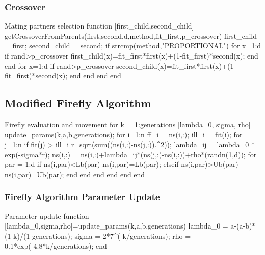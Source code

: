 \subsubsection{Crossover}
\begin{mylisting}[enhanced,drop shadow,label={alg:crossover}]{Mating partners selection}
function [first_child,second_child] = getCrossoverFromParents(first,second,d,method,fit_first,p_crossover)
  first_child = first;
  second_child = second;
  if strcmp(method,"PROPORTIONAL")
    for x=1:d
      if rand>p_crossover
        first_child(x)=fit_first*first(x)+(1-fit_first)*second(x);
      end
    end
    for x=1:d
      if rand>p_crossover
        second_child(x)=fit_first*first(x)+(1-fit_first)*second(x);
      end
    end
  end
end
\end{mylisting}

\subsection{Modified Firefly Algorithm}



\begin{mylisting}[enhanced,drop shadow,label={alg:fa_movement}]{Firefly evaluation and movement}
for k = 1:generations
  [lambda_0, sigma, rho] = update_params(k,a,b,generations);  
  for i=1:n
    ff_i = ns(i,:);
    ill_i = fit(i);
    for j=1:n
      if fit(j) > ill_i
        r=sqrt(sum((ns(i,:)-ns(j,:)).^2));
        lambda_ij = lambda_0 * exp(-sigma*r);
        ns(i,:) = ns(i,:)+lambda_ij*(ns(j,:)-ns(i,:))+rho*(randn(1,d));
        for par = 1:d
          if ns(i,par)<Lb(par) 
            ns(i,par)=Lb(par);
          elseif ns(i,par)>Ub(par)
            ns(i,par)=Ub(par);
          end
        end
      end
    end
  end
end
\end{mylisting}

\subsubsection{Firefly Algorithm Parameter Update}

\begin{mylisting}[enhanced,drop shadow,label={alg:fa_update}]{Parameter update}
function [lambda_0,sigma,rho]=update_params(k,a,b,generations)
  lambda_0 = a-(a-b)*(1-k)/(1-generations);
  sigma = 2*7^(-k/generations);
  rho = 0.1*exp(-4.8*k/generations);
end	
\end{mylisting}

